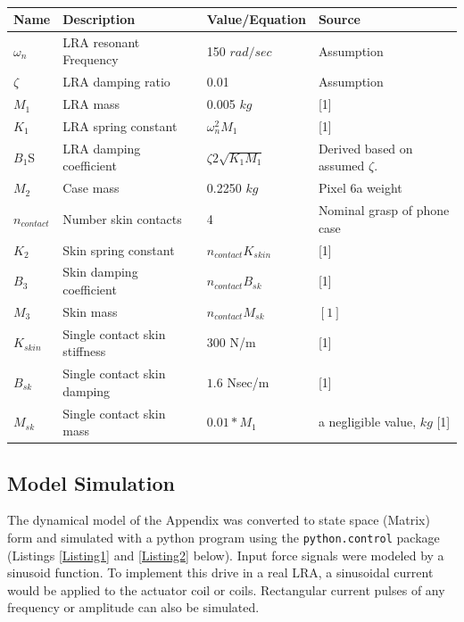 \documentclass[letterpaper,11pt]{article}
\begin{document}
\begin{table}[h]
\centering
\begin{tabular}{|l|l|p{1.25in}|p{1.05in}|}\hline

\textbf{Name} & \textbf{Description} & \textbf{Value/Equation} & {\bf Source}\\
\hline
$\omega_n$   &  LRA resonant Frequency &  150  $rad/sec$ & Assumption \\\hline
$\zeta$      &  LRA damping ratio      &   0.01          & Assumption \\\hline
$M_1$ & LRA mass & 0.005 $kg$  & [1]\\
\hline
$K_1$ & LRA spring constant & $\omega_n^2 M_1$ & [1]\\
\hline
$B_1$S & LRA damping coefficient & $\zeta   2\sqrt{K_1M_1}$ & Derived based on assumed $\zeta$.\\
\hline
$M_2$ & Case mass & 0.2250 $kg$ & Pixel 6a weight\\
\hline
$n_{contact}$  &  Number skin contacts & 4 & Nominal grasp of phone case \\
\hline
$K_2$ & Skin spring constant & $n_{contact}   K_{skin}$ & [1] \\
\hline
$B_3$ & Skin damping coefficient & $n_{contact}   B_{sk}$ & [1] \\
\hline
$M_3$ & Skin mass & $n_{contact}   M_{sk}$ &  $ [1] $ \\
\hline
$K_{skin}$ & Single contact skin stiffness & 300 N/m & [1] \\
\hline
$B_{sk}$ & Single contact skin damping & $1.6$ Nsec/m & [1]\\
\hline
$M_{sk}$ & Single contact skin mass    & $0.01*M_1$   & a negligible value, $kg$ [1] \\
\hline
\end{tabular}\caption{}\label{ParamTable}
\end{table}

\subsection{Model Simulation}

The dynamical model of the Appendix was converted to state space (Matrix) form and simulated with a python program using the {\tt python.control} package
(Listings \ref{Listing1} and \ref{Listing2} below).
Input force signals were modeled by a sinusoid function.
To implement this drive in a real LRA, a sinusoidal current would be applied to the
actuator coil or coils.  Rectangular current pulses of any frequency or amplitude can also be simulated.
\end{document}
